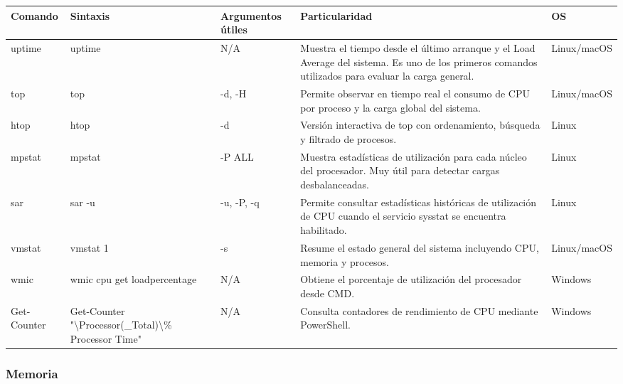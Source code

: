 \documentclass[a4paper,10pt]{article}
\begin{document}
\begin{longtable}{|p{2.8cm}|p{3.2cm}|p{4cm}|p{5.4cm}|p{1.5cm}|}

\hline
Comando &
Sintaxis &
Argumentos útiles &
Particularidad &
OS
\\
\hline
\endhead

uptime &
uptime &
N/A &
Muestra el tiempo desde el último arranque y el Load Average del sistema. Es uno de los primeros comandos utilizados para evaluar la carga general. &
Linux/macOS
\\
\hline

top &
top &
-d, -H &
Permite observar en tiempo real el consumo de CPU por proceso y la carga global del sistema. &
Linux/macOS
\\
\hline

htop &
htop &
-d &
Versión interactiva de top con ordenamiento, búsqueda y filtrado de procesos. &
Linux
\\
\hline

mpstat &
mpstat &
-P ALL &
Muestra estadísticas de utilización para cada núcleo del procesador. Muy útil para detectar cargas desbalanceadas. &
Linux
\\
\hline

sar &
sar -u &
-u, -P, -q &
Permite consultar estadísticas históricas de utilización de CPU cuando el servicio sysstat se encuentra habilitado. &
Linux
\\
\hline

vmstat &
vmstat 1 &
-s &
Resume el estado general del sistema incluyendo CPU, memoria y procesos. &
Linux/macOS
\\
\hline

wmic &
wmic cpu get loadpercentage &
N/A &
Obtiene el porcentaje de utilización del procesador desde CMD. &
Windows
\\
\hline

Get-Counter &
Get-Counter "\textbackslash Processor(\_Total)\textbackslash \% Processor Time" &
N/A &
Consulta contadores de rendimiento de CPU mediante PowerShell. &
Windows
\\
\hline

\end{longtable}


\subsubsection{Memoria}
\end{document}
